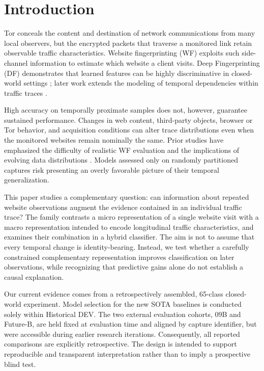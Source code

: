 \section{Introduction}\label{sec:introduction}
Tor conceals the content and destination of network communications from many local observers, but the encrypted packets that traverse a monitored link retain observable traffic characteristics. Website fingerprinting (WF) exploits such side-channel information to estimate which website a client visits. Deep Fingerprinting (DF) demonstrates that learned features can be highly discriminative in closed-world settings \citep{sirinam2018deep}; later work extends the modeling of temporal dependencies within traffic traces \citep{zhou2024transformer}.

High accuracy on temporally proximate samples does not, however, guarantee sustained performance. Changes in web content, third-party objects, browser or Tor behavior, and acquisition conditions can alter trace distributions even when the monitored websites remain nominally the same. Prior studies have emphasized the difficulty of realistic WF evaluation and the implications of evolving data distributions \citep{jansen2024repositioning,shusterman2026drift}. Models assessed only on randomly partitioned captures risk presenting an overly favorable picture of their temporal generalization.

This paper studies a complementary question: can information about repeated website observations augment the evidence contained in an individual traffic trace? The \LTD{} family contrasts a micro representation of a single website visit with a macro representation intended to encode longitudinal traffic characteristics, and examines their combination in a hybrid classifier. The aim is not to assume that every temporal change is identity-bearing. Instead, we test whether a carefully constrained complementary representation improves classification on later observations, while recognizing that predictive gains alone do not establish a causal explanation.

Our current evidence comes from a retrospectively assembled, 65-class closed-world experiment. Model selection for the new SOTA baselines is conducted solely within Historical DEV. The two external evaluation cohorts, 09B and Future-B, are held fixed at evaluation time and aligned by capture identifier, but were accessible during earlier research iterations. Consequently, all reported comparisons are explicitly retrospective. The design is intended to support reproducible and transparent interpretation rather than to imply a prospective blind test.

